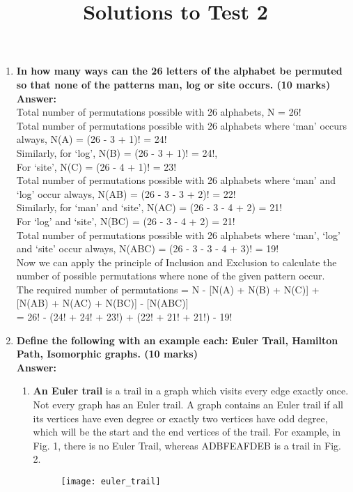 \documentclass[a4paper]{article}
\title{Solutions to Test 2}
\author{}
\begin{document}
\maketitle


\begin{enumerate}
    \item \textbf{In how many ways can the 26 letters of the alphabet be permuted so that none of the patterns man, log or site occurs.     (10 marks)}\\

\textbf{Answer:}\\
Total number of permutations possible with 26 alphabets, N = 26!\\

Total number of permutations possible with 26 alphabets where `man' occurs always, N(A) = (26 - 3 + 1)! = 24!\\
Similarly, for `log', N(B) = (26 - 3 + 1)! = 24!,\\
For `site', N(C) = (26 - 4 + 1)! = 23!\\

Total number of permutations possible with 26 alphabets where `man' and `log' occur always, N(AB) = (26 - 3 - 3 + 2)! = 22!\\
Similarly, for `man' and `site', N(AC) =  (26 - 3 - 4 + 2) = 21! \\
For `log' and `site', N(BC) = (26 - 3 - 4 + 2) = 21!\\

Total number of permutations possible with 26 alphabets where `man', `log' and `site' occur always, N(ABC) = (26 - 3 - 3 - 4 + 3)! = 19!\\

Now we can apply the principle of Inclusion and Exclusion to calculate the number of possible permutations where none of the given pattern occur.\\

The required number of permutations = N - [N(A) + N(B) + N(C)] + [N(AB) + N(AC) + N(BC)] - [N(ABC)]\\

= 26! - (24! + 24! + 23!) + (22! + 21! + 21!) - 19!


    \item \textbf{Define the following with an example each: Euler Trail, Hamilton Path, Isomorphic graphs.    (10 marks)}\\

\textbf{Answer:}    \\
\begin{enumerate}
\item \textbf{An Euler trail} is a trail in a graph which visits every edge exactly once.\\
Not every graph has an Euler trail. A graph contains an Euler trail if all its vertices have even degree or exactly two vertices have odd degree, which will be the start and the end vertices of the trail. For example, in Fig. 1, there is no Euler Trail, whereas ADBFEAFDEB is a trail in Fig. 2.
\begin{figure}[H]
\centering
\texttt{[image: euler\_trail]}
\end{figure}


\end{enumerate}
\end{enumerate}
\end{document}
